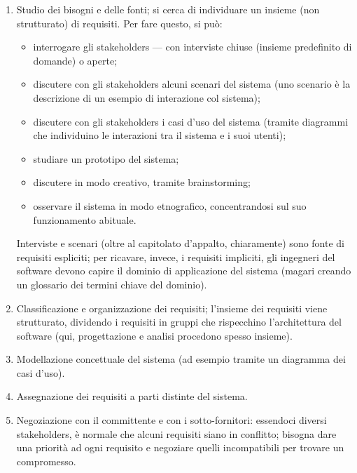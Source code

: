 \documentclass[a4paper]{article}
\begin{document}
	\begin{enumerate}
		
			
	\item Studio dei bisogni e delle fonti; si cerca di individuare un insieme (non strutturato) di requisiti. Per fare questo, si può:
				
	\begin{itemize}
		
					
	\item interrogare gli stakeholders --- con interviste chiuse (insieme predefinito di domande) o aperte;
					
	\item discutere con gli stakeholders alcuni scenari del sistema (uno scenario è la descrizione di un esempio di interazione col sistema);
					
	\item discutere con gli stakeholders i casi d'uso del sistema (tramite diagrammi che individuino le interazioni tra il sistema e i suoi utenti);
					
	\item studiare un prototipo del sistema;
					
	\item discutere in modo creativo, tramite brainstorming;
					
	\item osservare il sistema in modo etnografico, concentrandosi sul suo funzionamento abituale.
				
	\end{itemize}

			Interviste e scenari (oltre al capitolato d'appalto, chiaramente) sono fonte di requisiti espliciti; per ricavare, invece, i requisiti impliciti, gli ingegneri del software devono capire il dominio di applicazione del sistema (magari creando un glossario dei termini chiave del dominio).
			
			
	\item Classificazione e organizzazione dei requisiti; l'insieme dei requisiti viene strutturato, dividendo i requisiti in gruppi che rispecchino l'architettura del software (qui, progettazione e analisi procedono spesso insieme).
			
	\item Modellazione concettuale del sistema (ad esempio tramite un diagramma dei casi d'uso).
			
	\item Assegnazione dei requisiti a parti distinte del sistema.
			
	\item Negoziazione con il committente e con i sotto-fornitori: essendoci diversi stakeholders, è normale che alcuni requisiti siano in conflitto; bisogna dare una priorità ad ogni requisito e negoziare quelli incompatibili per trovare un compromesso.
		
	\end{enumerate}
\end{document}
